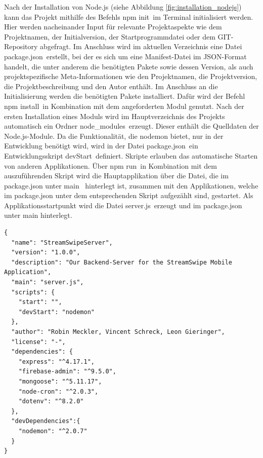 \noindent
Nach der Installation von Node.js (siehe Abbildung \ref{fig:installation_nodejs}) kann das Projekt mithilfe des Befehls \glqq npm init\grqq \, im Terminal initialisiert werden. 
Hier werden nacheinander Input für relevante Projektaspekte wie dem Projektnamen, der Initialversion, der Startprogrammdatei oder dem GIT-Repository abgefragt.  
Im Anschluss wird im aktuellen Verzeichnis eine Datei \glqq package.json\grqq \, erstellt,  bei der es sich um eine Manifest-Datei im JSON-Format handelt, die unter anderem die benötigten Pakete sowie dessen Version, als auch projektspezifische Meta-Informationen wie den Projektnamen, die Projektversion, die Projektbeschreibung und den Autor enthält.
\newline
Im Anschluss an die Initialisierung werden die benötigten Pakete installiert. Dafür wird der Befehl \glqq npm install\grqq \, in Kombination mit dem angeforderten Modul genutzt. 
Nach der ersten Installation eines Moduls wird im Hauptverzeichnis des Projekts automatisch ein Ordner \glqq node\_modules\grqq \, erzeugt. Dieser enthält die Quelldaten der Node.js-Module. 
\newline
Da die Funktionalität, die nodemon bietet, nur in der Entwicklung benötigt wird, wird in der Datei \glqq package.json\grqq \, ein Entwicklungsskript \glqq devStart\grqq \, definiert. 
Skripte erlauben das automatische Starten von anderen Applikationen. Über \glqq npm run\grqq \, in Kombination mit dem auszuführenden Skript wird die Hauptapplikation über die Datei, die im package.json unter \glqq main \grqq \, hinterlegt ist, zusammen mit den Applikationen, welche im package.json unter dem entsprechenden Skript aufgezählt sind, gestartet.
\newline
Als Applikationsstartpunkt wird die Datei \glqq server.js\grqq \, erzeugt und im package.json unter main hinterlegt.\\

\begin{lstlisting}[caption=Datei package.json, label=lst:packagejson]
{
  "name": "StreamSwipeServer",
  "version": "1.0.0",
  "description": "Our Backend-Server for the StreamSwipe Mobile Application",
  "main": "server.js",
  "scripts": {
    "start": "",
    "devStart": "nodemon"
  },
  "author": "Robin Meckler, Vincent Schreck, Leon Gieringer",
  "license": "-",
  "dependencies": {
    "express": "^4.17.1",
    "firebase-admin": "^9.5.0",
    "mongoose": "^5.11.17",
    "node-cron": "^2.0.3",
    "dotenv": "^8.2.0"
  },
  "devDependencies":{
    "nodemon": "^2.0.7"
  }
}
\end{lstlisting}

